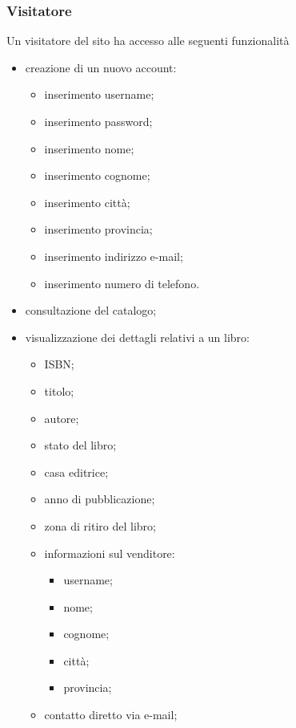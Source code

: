 \documentclass[openany,10pt,a4paper]{article}
\begin{document}
		\subsubsection{Visitatore}
		Un visitatore del sito ha accesso alle seguenti funzionalità
				\begin{itemize}
					\item creazione di un nuovo account:
						\begin{itemize}
							\item inserimento username;
							\item inserimento password;
							\item inserimento nome;
							\item inserimento cognome;
							\item inserimento città;
							\item inserimento provincia;
							\item inserimento indirizzo e-mail;
							\item inserimento numero di telefono.
						\end{itemize}
					\item consultazione del catalogo;
					\item visualizzazione dei dettagli relativi a un libro:
						\begin{itemize}
							\item ISBN;
							\item titolo;
							\item autore;
							\item stato del libro;
							\item casa editrice;
							\item anno di pubblicazione;
							\item zona di ritiro del libro;
							\item informazioni sul venditore:
								\begin{itemize}
									\item username;
									\item nome;
									\item cognome;
									\item città;
									\item provincia;
								\end{itemize}
							\item contatto diretto via e-mail;
						\end{itemize}
				\end{itemize}		
\end{document}
